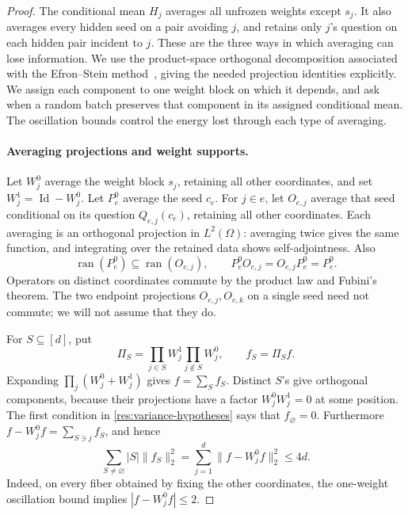 \begin{proof}
The conditional mean \(H_j\) averages all unfrozen weights except
\(s_j\). It also averages every hidden seed on a pair avoiding \(j\),
and retains only \(j\)'s question on each hidden pair incident to \(j\).
These are the three ways in which averaging can lose information.
We use the product-space orthogonal decomposition associated with
the Efron--Stein method~\cite[Section~2]{EfronStein1981}, giving the needed
projection identities explicitly. We assign each component to one
weight block on which it depends, and ask when a random batch preserves
that component in its assigned conditional mean. The oscillation
bounds control the energy lost through each type of averaging.

\paragraph{Averaging projections and weight supports.}
Let \(W_j^0\) average the weight block \(s_j\), retaining all other
coordinates, and set \(W_j^1=\operatorname{Id}-W_j^0\).  Let \(P_e^0\)
average the seed \(c_e\).  For \(j\in e\), let \(O_{e,j}\) average
that seed conditional on its question \(Q_{e,j}(c_e)\), retaining all
other coordinates.  Each averaging is an orthogonal projection in
\(L^2(\Omega)\): averaging twice gives the same function, and integrating
over the retained data shows self-adjointness.  Also
\[
 \operatorname{ran}(P_e^0)\subseteq\operatorname{ran}(O_{e,j}),
 \qquad P_e^0O_{e,j}=O_{e,j}P_e^0=P_e^0.
\]
Operators on distinct coordinates commute by the product law and Fubini's
theorem.  The two endpoint projections \(O_{e,j},O_{e,k}\) on a single
seed need not commute; we will not assume that they do.

For \(S\subseteq[d]\), put
\[
 \Pi_S=\prod_{j\in S}W_j^1\prod_{j\notin S}W_j^0,
 \qquad f_S=\Pi_Sf.
\]
Expanding \(\prod_j(W_j^0+W_j^1)\) gives \(f=\sum_Sf_S\).
Distinct \(S\)'s give orthogonal components, because their projections
have a factor \(W_j^0W_j^1=0\) at some position.  The first condition
in \eqref{res:variance-hypotheses} says that \(f_\varnothing=0\).
Furthermore
\(f-W_j^0f=\sum_{S\ni j}f_S\), and hence
\begin{equation}\label{res:weight-degree}
 \sum_{S\ne\varnothing}|S|\|f_S\|_2^2
   =\sum_{j=1}^d\|f-W_j^0f\|_2^2
   \leq4d.
\end{equation}
Indeed, on every fiber obtained by fixing the other coordinates, the
one-weight oscillation bound implies \(|f-W_j^0f|\leq2\).


\end{proof}

